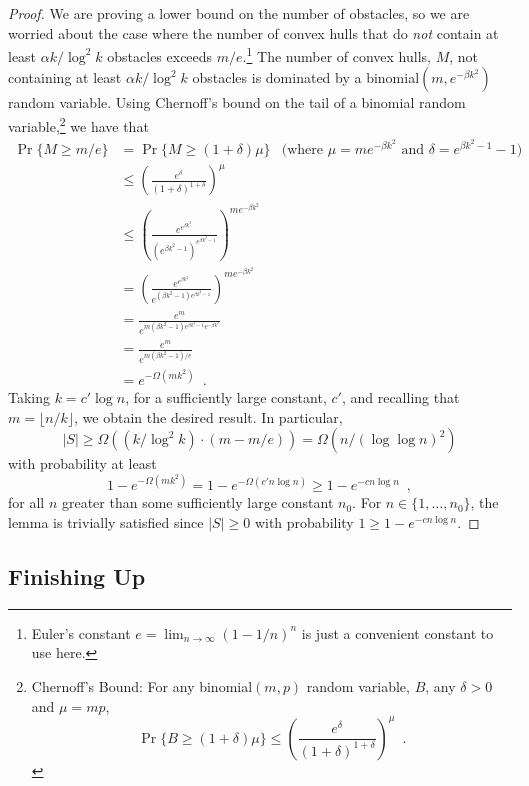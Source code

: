 \documentclass[12pt]{article}
\begin{document}
\begin{proof}
  We are proving a lower bound on the number of obstacles, so we are
  worried about the case where the number of convex hulls that do
  \emph{not} contain at least $\alpha k/\log^2 k$ obstacles exceeds
  $m/e$.\footnote{Euler's constant $e=\lim_{n\rightarrow \infty}
  (1-1/n)^n$ is just a convenient constant to use here.} The number of
  convex hulls, $M$, not containing at least $\alpha k/\log^2 k$ obstacles
  is dominated by a binomial$(m,e^{-\beta k^2})$ random variable.
  Using Chernoff's bound on the tail of a binomial random
  variable,\footnote{%
    Chernoff's Bound: For any binomial$(m,p)$ random variable, $B$,
    any $\delta>0$ and $\mu=mp$, 
    \[ \Pr\{B\ge (1+\delta)\mu\}
       \le \left(\frac{e^{\delta}}{(1+\delta)^{1+\delta}}\right)^{\mu} 
         \enspace . 
    \]
  }
  we have that
  \begin{align*}
    \Pr\{M \ge m/e\} & = \Pr\{M\ge (1+\delta)\mu\}
      & \text{(where $\mu=me^{-\beta k^2}$ and $\delta=e^{\beta k^2-1}-1$)} \\
      & \le \left(\frac{e^{\delta}}{(1+\delta)^{1+\delta}}\right)^{\mu} \\
      & \le \left(\frac{e^{e^{\beta k^2}}}{(e^{\beta k^2-1})^{e^{\beta k^2-1}}}\right)^{me^{-\beta k^2}}\\
      & = \left(\frac{e^{e^{\beta k^2}}}{e^{(\beta k^2-1)e^{\beta k^2-1}}}\right)^{me^{-\beta k^2}}\\
      & = \frac{e^{m}}{e^{m(\beta k^2-1)e^{\beta k^2-1}e^{-\beta k^2}}} \\
      & = \frac{e^{m}}{e^{m(\beta k^2-1)/e}} \\
      & = e^{-\Omega(mk^2)} \enspace .
  \end{align*}
  Taking $k=c'\log n$, for a sufficiently large constant, $c'$, and
  recalling that $m=\lfloor n/k\rfloor$, we obtain
  the desired result.  In particular,
  \[
      |S| \ge \Omega\left(\left(k/\log^2 k\right)\cdot (m-m/e) \right)
        = \Omega\left(n/(\log\log n)^2\right)
  \]
  with probability at least
  \[
      1-e^{-\Omega(mk^2)} = 1-e^{-\Omega(c'n\log n)} \ge 1-e^{-cn\log n} \enspace ,
  \]
  for all $n$ greater than some sufficiently large constant $n_0$.
  For $n\in\{1,\ldots,n_0\}$, the lemma is trivially satisfied since
  $|S|\ge 0$ with probability $1\ge 1-e^{-cn\log n}$.
\end{proof}

\subsection{Finishing Up}
\end{document}
